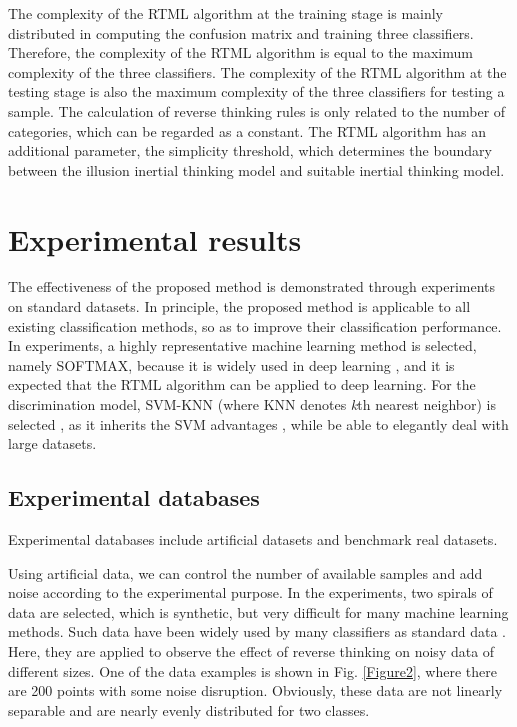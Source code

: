 The complexity of the RTML algorithm at the training stage is mainly distributed in computing the confusion matrix and training three classifiers. Therefore, the complexity of the RTML algorithm is equal to the maximum complexity of the three classifiers. The complexity of the RTML algorithm at the testing stage is also the maximum complexity of the three classifiers for testing a sample. The calculation of reverse thinking rules is only related to the number of categories, which can be regarded as a constant. The RTML algorithm has an additional parameter, the simplicity threshold, which determines the boundary between the illusion inertial thinking model and suitable inertial thinking model.

\section{Experimental results}

The effectiveness of the proposed method is demonstrated through experiments on standard datasets. In principle, the proposed method is applicable to all existing classification methods, so as to improve their classification performance. In experiments, a highly representative machine learning method is selected, namely SOFTMAX, because it is widely used in deep learning \cite{Szegedy2014,LeCun2015}, and it is expected that the RTML algorithm can be applied to deep learning. For the discrimination model, SVM-KNN (where KNN denotes \textit{k}th nearest neighbor) is selected \cite{Zhang2006}, as it inherits the SVM advantages \cite{Ji2017}, while be able to elegantly deal with large datasets.

\subsection{Experimental databases}
Experimental databases include artificial datasets and benchmark real datasets.

Using artificial data, we can control the number of available samples and add noise according to the experimental purpose. In the experiments, two spirals of data are selected, which is synthetic, but very difficult for many machine learning methods. Such data have been widely used by many classifiers as standard data \cite{Wen2013}. Here, they are applied to observe the effect of reverse thinking on noisy data of different sizes. One of the data examples is shown in Fig. \ref{Figure2}, where there are 200 points with some noise disruption. Obviously, these data are not linearly separable and are nearly evenly distributed for two classes.

